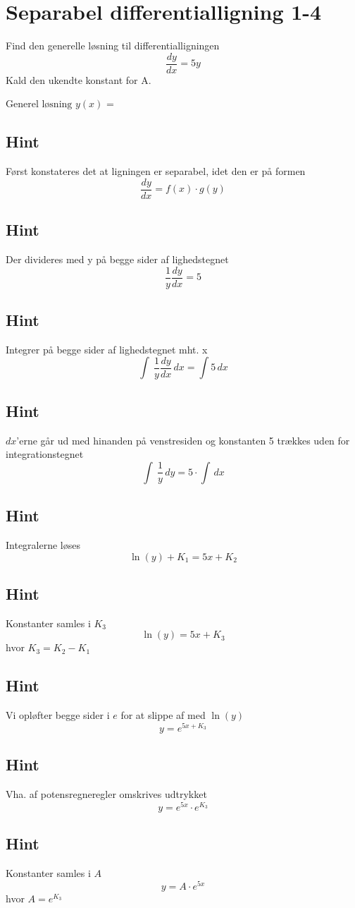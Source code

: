 \documentclass{article}
\newenvironment{exercise}[1]{\newpage\section{#1}}{}
\newcommand{\answerbox}[1]{\fbox{$#1$}}
\newcommand{\hint}{\subsection*{Hint}}
\begin{document}
\begin{exercise}{Separabel differentialligning 1-4}

	
	Find den generelle løsning til differentialligningen 
	\[
	\frac{dy}{dx} = 5y
	\]
	Kald den ukendte konstant for A.
	
	$\textrm{Generel løsning } y(x)$ = \answerbox{A \cdot e^{5x}}
	
	\hint
	
	Først konstateres det at ligningen er separabel, idet den er på formen
	\[
	\frac{dy}{dx} = f(x) \cdot g(y)
	\]
	
	\hint 
	Der divideres med y på begge sider af lighedstegnet
	\[
	\frac{1}{y} \frac{dy}{dx} = 5
	\]
	
	\hint
	
	Integrer på begge sider af lighedstegnet mht. x
	\[
	\int\ \frac{1}{y} \frac{dy}{dx} \, dx= \int 5 \,dx
	\]
	
	\hint
	
	$dx$'erne går ud med hinanden på venstresiden og konstanten 5 trækkes uden for integrationstegnet
	\[
	\int\ \frac{1}{y}\, dy= 5 \cdot \int \,dx
	\]
	
	\hint
	
	Integralerne løses
	\[
	\ln(y) + K_1 =5x + K_2
	\]
	
	
	\hint
	
	Konstanter samles i $K_3$
	\[
	\ln(y) =5x + K_3
	\]
	hvor $K_3=K_2-K_1$
	
	\hint 
	
	Vi opløfter begge sider i $e$ for at slippe af med $\ln(y)$
	\[
	y = e^{5x+K_3}
	\]
	
	\hint
	
	Vha.  af potensregneregler omskrives udtrykket
	\[
	y = e^{5x} \cdot e^{K_3}
	\]
	
	\hint
	
	Konstanter samles i $A$
	\[
	y = A \cdot e^{5x}
	\]
	hvor $ A= e^{K_3}$
	
	\end{exercise}

\newpage
\end{document}
